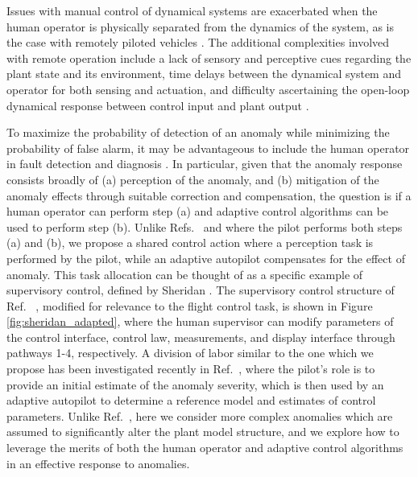 

Issues with manual control of dynamical systems are exacerbated when the human operator is physically separated from the dynamics of the system, as is the case with remotely piloted vehicles \cite{mccarley2004human, tvaryanas2008recurrent}. The additional complexities involved with remote operation include a lack of sensory and perceptive cues regarding the plant state and its environment, time delays between the dynamical system and operator for both sensing and actuation, and difficulty ascertaining the open-loop dynamical response between control input and plant output \cite{lam2008haptic}. 


To maximize the probability of detection of an anomaly while minimizing the probability of false alarm, it may be advantageous to include the human operator in fault detection and diagnosis \cite{sheridan2000human}. In particular, given that the anomaly response consists broadly of (a) perception of the anomaly, and (b) mitigation of the anomaly effects through suitable correction and compensation, the question is if a human operator can perform step (a) and adaptive control algorithms can be used to perform step (b). Unlike Refs.~\cite{hess2015modeling} and \cite{hess2009modeling} where the pilot performs both steps (a) and (b), we propose a shared control action where a perception task is performed by the pilot, while an adaptive autopilot compensates for the effect of anomaly. This task allocation can be thought of as a specific example of supervisory control, defined by Sheridan \cite{sheridan1976toward, sheridan2011adaptive}. The supervisory control structure of Ref.~ \cite{sheridan2011adaptive}, modified for relevance to the flight control task, is shown in Figure \ref{fig:sheridan_adapted}, where the human supervisor can modify parameters of the control interface, control law, measurements, and display interface through pathways 1-4, respectively. A division of labor similar to the one which we propose has been investigated recently in Ref.~\cite{farjadian2017bumpless}, where the pilot's role is to provide an initial estimate of the anomaly severity, which is then used by an adaptive autopilot to determine a reference model and estimates of control parameters. Unlike Ref.~\cite{farjadian2017bumpless}, here we consider more complex anomalies which are assumed to significantly alter the plant model structure, and we explore how to leverage the merits of both the human operator and adaptive control algorithms in an effective response to anomalies.

